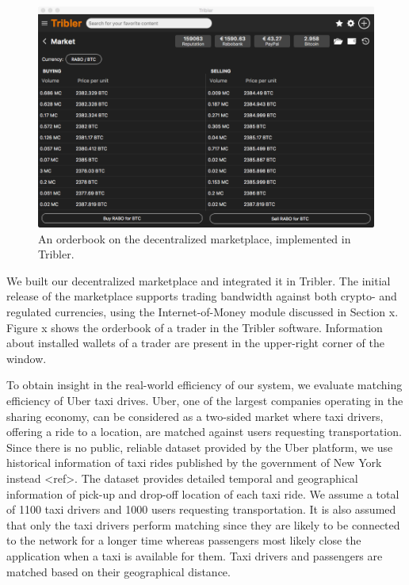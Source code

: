 \documentclass[USenglish]{article}
\begin{document}
\begin{figure}[t]
	\centering
	\includegraphics[width=.9\columnwidth]{assets/tribler_market}
	\caption{An orderbook on the decentralized marketplace, implemented in Tribler.}
	\label{fig:tribler_market}
\end{figure}

We built our decentralized marketplace and integrated it in Tribler.
The initial release of the marketplace supports trading bandwidth against both crypto- and regulated currencies, using the Internet-of-Money module discussed in Section x.
Figure x shows the orderbook of a trader in the Tribler software.
Information about installed wallets of a trader are present in the upper-right corner of the window.

To obtain insight in the real-world efficiency of our system, we evaluate matching efficiency of Uber taxi drives.
Uber, one of the largest companies operating in the sharing economy, can be considered as a two-sided market where taxi drivers, offering a ride to a location, are matched against users requesting transportation.
Since there is no public, reliable dataset provided by the Uber platform, we use historical information of taxi rides published by the government of New York instead <ref>.
The dataset provides detailed temporal and geographical information of pick-up and drop-off location of each taxi ride.
We assume a total of 1100 taxi drivers and 1000 users requesting transportation.
It is also assumed that only the taxi drivers perform matching since they are likely to be connected to the network for a longer time whereas passengers most likely close the application when a taxi is available for them.
Taxi drivers and passengers are matched based on their geographical distance.
\end{document}
